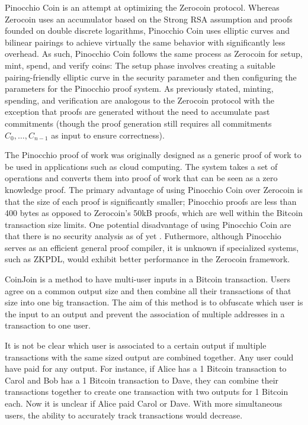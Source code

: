 Pinocchio Coin \cite{pinocchio} is an attempt at optimizing the Zerocoin protocol. Whereas Zerocoin uses an accumulator based on the Strong RSA assumption and proofs founded on double discrete logarithms, Pinocchio Coin uses elliptic curves and bilinear pairings to achieve virtually the same behavior with significantly less overhead. As such, Pinocchio Coin follows the same process as Zerocoin for {\sf setup}, {\sf mint}, {\sf spend}, and {\sf verify} coins: The setup phase involves creating a suitable pairing-friendly elliptic curve in the security parameter and then configuring the parameters for the Pinocchio proof system. As previously stated, minting, spending, and verification are analogous to the Zerocoin protocol with the exception that proofs are generated without the need to accumulate past commitments (though the proof generation still requires all commitments $C_0,\dots,C_{n-1}$ as input to ensure correctness). 


The Pinocchio proof of work was originally designed as a generic proof of work to be used in applications such as cloud computing. The system takes a set of operations and converts them into proof of work that can be seen as a zero knowledge proof. The primary advantage of using Pinocchio Coin over Zerocoin is that the size of each proof is significantly smaller; Pinocchio proofs are less than 400 bytes as opposed to Zerocoin's 50kB proofs, which are well within the Bitcoin transaction size limits. One potential disadvantage of using Pinocchio Coin are that there is no security analysis as of yet \cite{pinocchio}. Futhermore, although Pinocchio serves as an efficient general proof compiler, it is unknown if specialized systems, such as ZKPDL, would exhibit better performance in the Zerocoin framework.

CoinJoin \cite{coinjoin} is a method to have multi-user inputs in a Bitcoin transaction. Users agree on a common output size and then combine all their transactions of that size into one big transaction. The aim of this method is to obfuscate which user is the input to an output and prevent the association of multiple addresses in a transaction to one user.

It is not be clear which user is associated to a certain output if multiple transactions with the same sized output are combined together. Any user could have paid for any output. For instance, if Alice has a 1 Bitcoin transaction to Carol and Bob has a 1 Bitcoin transaction to Dave, they can combine their transactions together to create one transaction with two outputs for 1 Bitcoin each. Now it is unclear if Alice paid Carol or Dave. With more simultaneous users, the ability to accurately track transactions would decrease.

